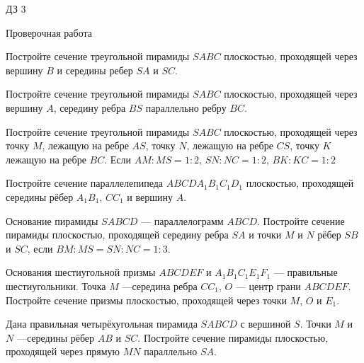\begin{homework}[number=3]
	\begin{listofex}
		\item ДЗ 3
	\end{listofex}
\end{homework}

\begin{exam}
	\begin{listofex}
		\item Проверочная работа
	\end{listofex}
\end{exam}

\begin{consultation}
	\begin{listofex}
		\item Постройте сечение треугольной пирамиды \(SABC\) плоскостью, проходящей через вершину \(B\) и середины ребер \(SA\) и \(SC\).
		\item Постройте сечение треугольной пирамиды \(SABC\) плоскостью, проходящей через вершину \(A\), середину ребра \(BS\) параллельно ребру \(BC\).
		\item  Постройте сечение треугольной пирамиды \(SABC\) плоскостью, проходящей через точку \(M\), лежащую на ребре \(AS\), точку \(N\), лежащую на ребре \(CS\), точку \(K\) лежащую на ребре \(BC\). Если \(AM:MS=1:2\), \(SN:NC=1:2\), \(BK:KC=1:2\)
		\item  Постройте сечение параллелепипеда \(ABCDA_1B_1C_1D_1\) плоскостью, проходящей середины рёбер \(A_1B_1\), \(CC_1\) и вершину \(A\).
		\item Основание пирамиды \(SABCD\) — параллелограмм \(ABCD\). Постройте сечение пирамиды плоскостью, проходящей середину ребра \(SA\) и точки \(M\) и \(N\) рёбер \(SB\) и \(SC\), если \(BM:MS=SN:NC =1:3\).
		\item  Основания шестиугольной призмы \(ABCDEF\) и \(A_1B_1C_1E_1F_1\) --- правильные шестиугольники. Точка \(M\) —середина ребра \(CC_1\), \(O\) --- центр грани \(ABCDEF\). Постройте сечение призмы плоскостью, проходящей через точки \(M\), \(O\) и \(E_1\).
		\item  Дана правильная четырёхугольная пирамида \(SABCD\) с вершиной \(S\). Точки \(M\) и \(N\) —середины рёбер \(AB\) и \(SC\). Постройте сечение пирамиды плоскостью, проходящей через прямую \(MN\) параллельно \(SA\).
	\end{listofex}
\end{consultation}
